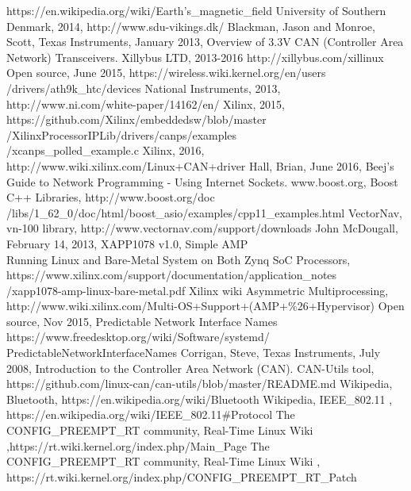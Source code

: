 \begin{thebibliography}{21} %
		https://en.wikipedia.org/wiki/Earth's\_magnetic\_field
		University of Southern Denmark, 2014, http://www.sdu-vikings.dk/
		Blackman, Jason and Monroe, Scott, Texas Instruments, January 2013, Overview of 3.3V CAN (Controller Area Network) Transceivers.
		Xillybus LTD, 2013-2016 http://xillybus.com/xillinux
		Open source, June 2015, https://wireless.wiki.kernel.org/en/users\\
		/drivers/ath9k\_htc/devices
		National Instruments, 2013, http://www.ni.com/white-paper/14162/en/
		Xilinx, 2015, https://github.com/Xilinx/embeddedsw/blob/master\\
		/XilinxProcessorIPLib/drivers/canps/examples\\
		/xcanps\_polled\_example.c
		Xilinx, 2016, http://www.wiki.xilinx.com/Linux+CAN+driver
		Hall, Brian, June 2016, Beej's Guide to Network Programming - Using Internet Sockets.
		www.boost.org, Boost C++ Libraries, http://www.boost.org/doc \\
		/libs/1\_62\_0/doc/html/boost\_asio/examples/cpp11\_examples.html
		VectorNav, vn-100 library, http://www.vectornav.com/support/downloads
		John McDougall, February 14, 2013, XAPP1078 v1.0, Simple AMP\\
		Running Linux and Bare-Metal System on Both Zynq SoC Processors,\\
		https://www.xilinx.com/support/documentation/application\_notes\\
		/xapp1078-amp-linux-bare-metal.pdf
		Xilinx wiki Asymmetric Multiprocessing,\\
		http://www.wiki.xilinx.com/Multi-OS+Support+(AMP+\%26+Hypervisor)
		Open source, Nov 2015, Predictable Network Interface Names \\
		https://www.freedesktop.org/wiki/Software/systemd/\\
		PredictableNetworkInterfaceNames
			Corrigan, Steve, Texas Instruments, July 2008, Introduction to the Controller Area Network (CAN).
			CAN-Utils tool, https://github.com/linux-can/can-utils/blob/master/README.md
			Wikipedia, Bluetooth, https://en.wikipedia.org/wiki/Bluetooth
			Wikipedia, IEEE\_802.11 , https://en.wikipedia.org/wiki/IEEE\_802.11\#Protocol
			The CONFIG\_PREEMPT\_RT community, Real-Time Linux Wiki ,https://rt.wiki.kernel.org/index.php/Main\_Page
			The CONFIG\_PREEMPT\_RT community, Real-Time Linux Wiki , https://rt.wiki.kernel.org/index.php/CONFIG\_PREEMPT\_RT\_Patch
\end{thebibliography}
